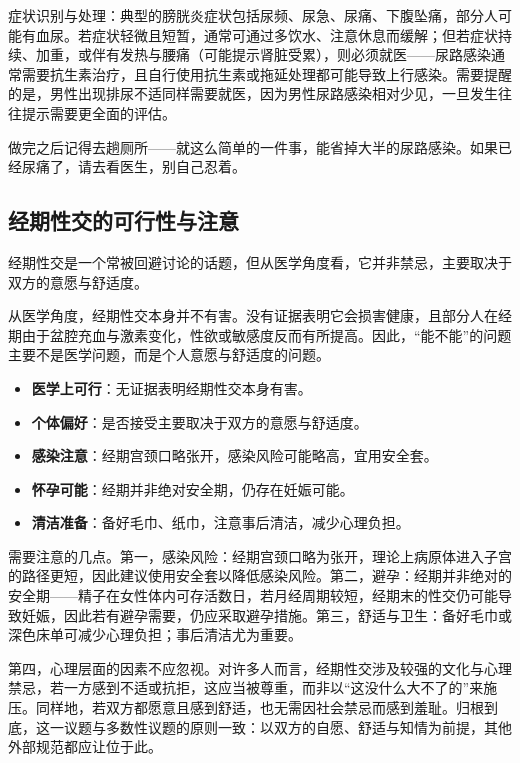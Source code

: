 \documentclass[12pt,UTF8]{ctexbook}
\begin{document}
症状识别与处理：典型的膀胱炎症状包括尿频、尿急、尿痛、下腹坠痛，部分人可能有血尿。若症状轻微且短暂，通常可通过多饮水、注意休息而缓解；但若症状持续、加重，或伴有发热与腰痛（可能提示肾脏受累），则必须就医——尿路感染通常需要抗生素治疗，且自行使用抗生素或拖延处理都可能导致上行感染。需要提醒的是，男性出现排尿不适同样需要就医，因为男性尿路感染相对少见，一旦发生往往提示需要更全面的评估。

\begin{tcolorbox}[colback=pink!5!white,colframe=red!50!black,title=贴心小叮咛]
	做完之后记得去趟厕所——就这么简单的一件事，能省掉大半的尿路感染。如果已经尿痛了，请去看医生，别自己忍着。
\end{tcolorbox}

\subsection{经期性交的可行性与注意}

经期性交是一个常被回避讨论的话题，但从医学角度看，它并非禁忌，主要取决于双方的意愿与舒适度。

从医学角度，经期性交本身并不有害。没有证据表明它会损害健康，且部分人在经期由于盆腔充血与激素变化，性欲或敏感度反而有所提高。因此，“能不能”的问题主要不是医学问题，而是个人意愿与舒适度的问题。

\begin{itemize}
	\item \textbf{医学上可行}：无证据表明经期性交本身有害。
	\item \textbf{个体偏好}：是否接受主要取决于双方的意愿与舒适度。
	\item \textbf{感染注意}：经期宫颈口略张开，感染风险可能略高，宜用安全套。
	\item \textbf{怀孕可能}：经期并非绝对安全期，仍存在妊娠可能。
	\item \textbf{清洁准备}：备好毛巾、纸巾，注意事后清洁，减少心理负担。
\end{itemize}

需要注意的几点。第一，感染风险：经期宫颈口略为张开，理论上病原体进入子宫的路径更短，因此建议使用安全套以降低感染风险。第二，避孕：经期并非绝对的安全期——精子在女性体内可存活数日，若月经周期较短，经期末的性交仍可能导致妊娠，因此若有避孕需要，仍应采取避孕措施。第三，舒适与卫生：备好毛巾或深色床单可减少心理负担；事后清洁尤为重要。

第四，心理层面的因素不应忽视。对许多人而言，经期性交涉及较强的文化与心理禁忌，若一方感到不适或抗拒，这应当被尊重，而非以“这没什么大不了的”来施压。同样地，若双方都愿意且感到舒适，也无需因社会禁忌而感到羞耻。归根到底，这一议题与多数性议题的原则一致：以双方的自愿、舒适与知情为前提，其他外部规范都应让位于此。
\end{document}
